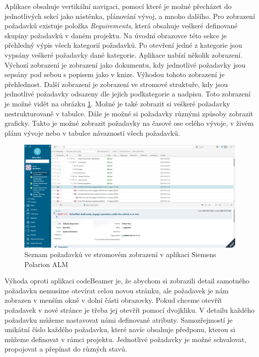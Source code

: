 \documentclass[czech,master,public,dept460,male,cpdeclaration,oneside]{diploma}
\begin{document}
Aplikace obsahuje vertikální navigaci, pomocí které je možné přecházet do jednotlivých sekcí jako nástěnka, plánování vývoj, a mnoho dalšího. Pro zobrazení požadavků existuje položka \textit{Requirements}, která obsahuje veškeré definované skupiny požadavků v daném projektu. Na úvodní obrazovce této sekce je přehledný výpis všech kategorií požadavků. Po otevření jedné z kategorie jsou vypsány veškeré požadavky dané kategorie. Aplikace nabízí několik zobrazení. Výchozí zobrazení je zobrazení jako dokumentu, kdy jednotlivé požadavky jsou sepsány pod sebou s popisem jako v knize. Výhodou tohoto zobrazení je přehlednost. Další zobrazení je zobrazení ve stromové struktuře, kdy jsou jednotlivé požadavky odsazeny dle jejich podkategorie a nadpisu. Toto zobrazení je možné vidět na obrázku \ref{fig:polarion_requirements}. Možné je také zobrazit si veškeré požadavky nestrukturovaně v tabulce. Dále je možné si požadavky různými způsoby zobrazit graficky. Takto je možné zobrazit požadavky na časové ose celého vývoje, v živém plánu vývoje nebo v tabulce návazností všech požadavků.

\begin{figure}[!ht]
    \centering
    \includegraphics[width=1\textwidth]{Diplomka/Figures/polarion_requirements.png}
    \caption{Seznam požadavků ve stromovém zobrazení v aplikaci Siemens Polarion ALM}
    \label{fig:polarion_requirements}
\end{figure}

Výhoda oproti aplikaci codeBeamer je, že abychom si zobrazili detail samotného požadavku nemusíme otevírat celou novou stránku, ale požadavek je nám zobrazen v menším okně v dolní části obrazovky. Pokud chceme otevřít požadavek v nové stránce je třeba jej otevřít pomocí dvojkliku. V detailu každého požadavku můžeme nastavovat námi definované atributy. Samozřejmostí je unikátní číslo každého požadavku, které navíc obsahuje předponu, kterou si můžeme definovat v rámci projektu. Jednotlivé požadavky je možné schvalovat, propojovat a přepínat do různých stavů.
\end{document}
